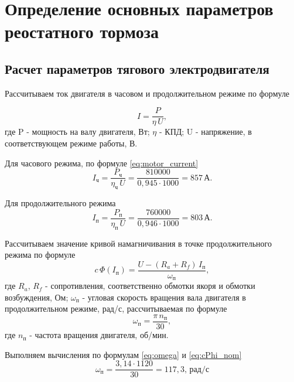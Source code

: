 \chapter{Определение основных параметров реостатного тормоза}
\section{Расчет параметров тягового электродвигателя}

Рассчитываем ток двигателя в часовом и продолжительном режиме по формуле

\begin{equation}
  \label{eq:motor_current}
  I = \frac{P}{\eta \, U}, 
\end{equation}
где P - мощность на валу двигателя, Вт; $\eta$ - КПД; U - напряжение, в соответствующем режиме работы, В.

Для часового режима, по формуле \eqref{eq:motor_current}
\begin{equation*}
  I_{\text{ч}} = \frac{P_{\text{ч}}}{\eta_{\text{ч}} \, U} = \frac{810000}{0,945 \cdot 1000} = 857 \, \text{А}.
\end{equation*}

Для продолжительного режима
\begin{equation*}
  I_{\text{п}} = \frac{P_{\text{п}}}{\eta_{\text{п}} \, U} = \frac{760000}{0,946 \cdot 1000} = 803 \, \text{А}.
\end{equation*}

Рассчитываем значение кривой намагничивания в точке продолжительного режима по формуле
\begin{equation}
 \label{eq:cPhi_nom}
 c\,\Phi(I_{\text{п}}) = \frac{U - \left( R_a + R_f \right) \, I_{\text{п} }}{\omega_{\text{п}}},
\end{equation}
где $R_a$, $R_f$ - сопротивления, соответственно обмотки якоря и обмотки возбуждения, Ом; $\omega_{\text{п}}$ - угловая скорость вращения вала двигателя в продолжительном режиме, рад/с, рассчитываемая по формуле
\begin{equation}
 \label{eq:omega}
 \omega_{\text{п}} = \frac{\pi \, n_{\text{п}}}{30}, 
\end{equation}
где $n_{\text{п}}$ - частота вращения двигателя, об/мин.

Выполняем вычисления по формулам \eqref{eq:omega} и \eqref{eq:cPhi_nom}
\begin{equation*} 
 \omega_{\text{п}} = \frac{3,14 \cdot 1120}{30} = 117,3, \, \text{рад/с}
\end{equation*}

